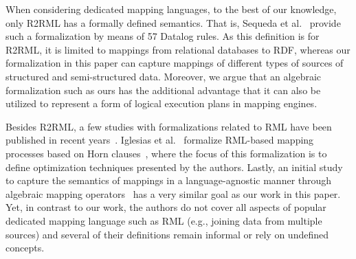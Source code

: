 
When considering dedicated mapping languages, to the best of our knowledge, only R2RML has a formally defined semantics. That is, Sequeda et al.~\cite{Sequeda2013R2RML} provide such a formalization by means of 57 Datalog rules. As this definition is for R2RML, it is limited to mappings from relational databases to RDF, whereas our formalization in this paper can capture mappings of different types of sources of structured and semi-structured data. Moreover, we argue that an algebraic formalization such as ours has the additional advantage that it can also be utilized to represent a form of logical execution plans in mapping engines.

Besides R2RML, a few studies with formalizations related to RML have been published in recent years~\cite{Iglesias2022ScalingKnowledgeGraph,MinOo2023TowardsAlgebra}.
%
Iglesias et al.\
	formalize
RML-based mapping processes based on Horn clauses~\cite{Iglesias2022ScalingKnowledgeGraph}, where the focus of this formalization is to define optimization techniques presented by the authors.
%
Lastly, an initial study to capture the semantics of mappings in a language-agnostic manner through algebraic mapping operators~\cite{MinOo2023TowardsAlgebra} has a very similar goal as our work in this paper. Yet, in contrast to our work, the authors do not cover all aspects of
	popular
dedicated mapping language such as RML (e.g., joining data from multiple sources) and several of their definitions remain informal or rely on undefined concepts.

